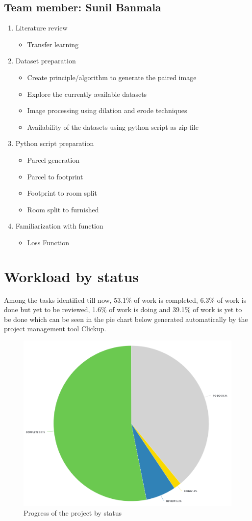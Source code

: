 \subsection{Team member: Sunil Banmala}
\begin{enumerate}[label=\alph*.]
\item Literature review
\begin{itemize}
    \item Transfer learning
\end{itemize}
\item Dataset preparation
\begin{itemize}
    \item Create principle/algorithm to generate the paired image
    \item Explore the currently available datasets
    \item Image processing using dilation and erode techniques
    \item Availability of the datasets using python script as zip file
\end{itemize}
\item Python script preparation
\begin{itemize}
    \item Parcel generation
    \item Parcel to footprint
    \item Footprint to room split
    \item Room split to furnished
\end{itemize}
\item{Familiarization with function}
\begin{itemize}
    \item Loss Function
\end{itemize}
\end{enumerate}

\section{Workload by status}
Among the tasks identified till now, 53.1\% of work is completed, 6.3\% of work is done but yet to be reviewed, 1.6\% of work is doing and 39.1\% of work is yet to be done which can be seen in the pie chart below generated automatically by the project management tool Clickup.
\begin{figure}[h]                 
    \centering                 
    \includegraphics[width=.6\textwidth]{img/methodology/workload_by_status.png}               
    \caption{Progress of the project by status}                 
    \label{fig:workload-by-status}         
\end{figure}
